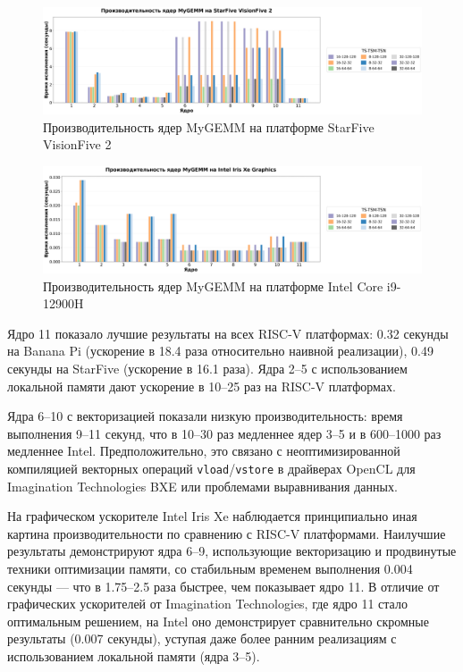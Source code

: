 \begin{figure}[H]
\centering
\includegraphics[width=1\textwidth]{figures/starfive.png}
\caption{Производительность ядер MyGEMM на платформе StarFive VisionFive 2}
\label{fig:perf_starfive}
\end{figure}

\begin{figure}[H]
\centering
\includegraphics[width=1\textwidth]{figures/intel_xe.png}
\caption{Производительность ядер MyGEMM на платформе Intel Core i9-12900H}
\label{fig:perf_intelxe}
\end{figure}

Ядро 11 показало лучшие результаты на всех RISC-V платформах: 0.32 секунды на Banana Pi (ускорение в 18.4 раза относительно наивной реализации), 0.49 секунды на StarFive (ускорение в 16.1 раза). Ядра 2--5 с использованием локальной памяти дают ускорение в 10--25 раз на RISC-V платформах.

Ядра 6--10 с векторизацией показали низкую производительность: время выполнения 9--11 секунд, что в 10--30 раз медленнее ядер 3--5 и в 600--1000 раз медленнее Intel. Предположительно, это связано с неоптимизированной компиляцией векторных операций \texttt{vload}/\texttt{vstore} в драйверах OpenCL для Imagination Technologies BXE или проблемами выравнивания данных.

На графическом ускорителе Intel Iris Xe наблюдается принципиально иная картина производительности по сравнению с RISC-V платформами. Наилучшие результаты демонстрируют ядра 6–9, использующие векторизацию и продвинутые техники оптимизации памяти, со стабильным временем выполнения 0.004 секунды — что в 1.75–2.5 раза быстрее, чем показывает ядро 11. В отличие от графических ускорителей от Imagination Technologies, где ядро 11 стало оптимальным решением, на Intel оно демонстрирует сравнительно скромные результаты (0.007 секунды), уступая даже более ранним реализациям с использованием локальной памяти (ядра 3–5). 

